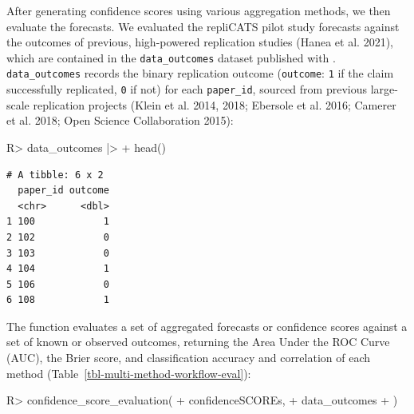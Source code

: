\documentclass[
  11pt,
  a4paper,
]{article}
\newenvironment{Shaded}{\begin{snugshade}}{\end{snugshade}}
\newcommand{\FunctionTok}[1]{\textcolor[rgb]{0.28,0.35,0.67}{#1}}
\newcommand{\NormalTok}[1]{\textcolor[rgb]{0.00,0.23,0.31}{#1}}
\newcommand{\SpecialCharTok}[1]{\textcolor[rgb]{0.37,0.37,0.37}{#1}}
\begin{document}
After generating confidence scores using various aggregation methods, we
then evaluate the forecasts. We evaluated the repliCATS pilot study
forecasts against the outcomes of previous, high-powered replication
studies ({Hanea et al.} 2021), which are contained in the
\texttt{data\_outcomes} dataset published with .
\texttt{data\_outcomes} records the binary replication outcome
(\texttt{outcome}: \texttt{1} if the claim successfully replicated,
\texttt{0} if not) for each \texttt{paper\_id}, sourced from previous
large-scale replication projects ({Klein et al.} 2014, 2018; {Ebersole
et al.} 2016; Camerer et al. 2018; Open Science Collaboration 2015):

\begin{Shaded}
\begin{Highlighting}[]
\NormalTok{R}\SpecialCharTok{\textgreater{}}\NormalTok{ data\_outcomes }\SpecialCharTok{|\textgreater{}}
\SpecialCharTok{+}    \FunctionTok{head}\NormalTok{()}
\end{Highlighting}
\end{Shaded}

\begin{verbatim}
# A tibble: 6 x 2
  paper_id outcome
  <chr>      <dbl>
1 100            1
2 102            0
3 103            0
4 104            1
5 106            0
6 108            1
\end{verbatim}

The function  evaluates a set of
aggregated forecasts or confidence scores against a set of known or
observed outcomes, returning the Area Under the ROC Curve (AUC), the
Brier score, and classification accuracy and correlation of each method
(Table~\ref{tbl-multi-method-workflow-eval}):

\begin{Shaded}
\begin{Highlighting}[]
\NormalTok{R}\SpecialCharTok{\textgreater{}} \FunctionTok{confidence\_score\_evaluation}\NormalTok{(}
\SpecialCharTok{+}\NormalTok{    confidenceSCOREs,}
\SpecialCharTok{+}\NormalTok{    data\_outcomes}
\SpecialCharTok{+}\NormalTok{  )}
\end{Highlighting}
\end{Shaded}
\end{document}

